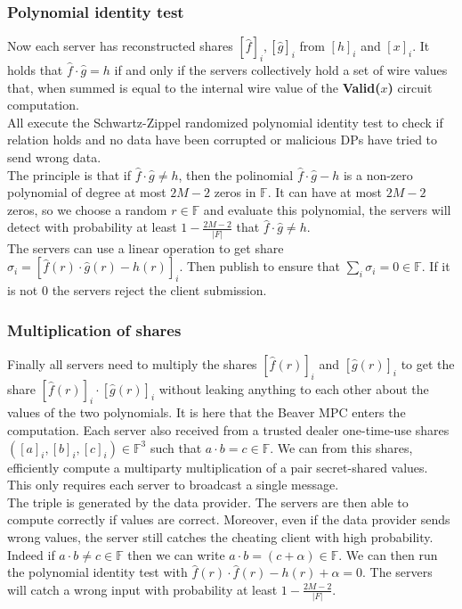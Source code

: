 \documentclass{article}
\begin{document}
\subsubsection{Polynomial identity test}
Now each server has reconstructed shares $[\hat{f}]_i, [\hat{g}]_i$ from $[h]_i$ and $[x]_i$. It holds that $ \hat{f} \cdot \hat{g} = h$ if and only if the servers collectively hold a set of wire values that, when summed is equal to the internal wire value of the \textbf{Valid($x$)} circuit computation.\\
All execute the Schwartz-Zippel randomized polynomial identity test \cite{polyverif} to check if relation holds and no data have been corrupted or malicious DPs have tried to send wrong data.\\
The principle is that if $ \hat{f} \cdot \hat{g} \neq h$, then the polinomial $ \hat{f} \cdot \hat{g} - h$ is a non-zero polynomial of degree at most $2M-2$ zeros in $\mathbb{F}$. It can have at most $2M-2$ zeros, so we choose a random $r \in \mathbb{F}$ and evaluate this polynomial, the servers will detect with probability at least $1 - \frac{2M-2}{|F|}$ that $ \hat{f} \cdot \hat{g} \neq h$.\\
The servers can use a linear operation to get share $\sigma_i = [ \hat{f}(r) \cdot \hat{g}(r) - h(r)]_i$. Then publish to ensure that $\sum_{i}{\sigma_i} = 0 \in \mathbb{F}$. If it is not $0$ the servers reject the client submission.
\subsubsection{Multiplication of shares}
Finally all servers need to multiply the shares $ [\hat{f}(r)]_i $ and $ [\hat{g}(r)]_i$ to get the share $[\hat{f}(r)]_i \cdot [\hat{g}(r)]_i$ without leaking anything to each other about the values of the two polynomials. It is here that the Beaver MPC enters the computation. Each server also received from a trusted dealer one-time-use shares $([a]_i,[b]_i,[c]_i) \in \mathbb{F}^3 $ such that $a \cdot b = c \in \mathbb{F}$. We can from this shares, efficiently compute a multiparty multiplication of a pair secret-shared values. This only requires each server to broadcast a single message.\\
The triple is generated by the data provider. The servers are then able to compute correctly if values are correct. Moreover, even if the data provider sends wrong values, the server still catches the cheating client with high probability. Indeed if $a \cdot b \neq c \in \mathbb{F}$ then we can write $a \cdot b = (c + \alpha) \in \mathbb{F}$. We can then run the polynomial identity test with $\hat{f}(r) \cdot \hat{f}(r) - h(r) + \alpha = 0$. The servers will catch a wrong input with probability at least $1 - \frac{2M-2}{|F|}$.
\end{document}
